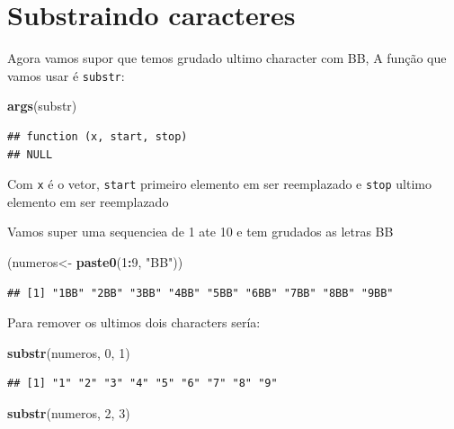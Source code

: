 \documentclass[]{book}
\newenvironment{Shaded}{\begin{snugshade}}{\end{snugshade}}
\newcommand{\KeywordTok}[1]{\textcolor[rgb]{0.13,0.29,0.53}{\textbf{#1}}}
\newcommand{\DecValTok}[1]{\textcolor[rgb]{0.00,0.00,0.81}{#1}}
\newcommand{\StringTok}[1]{\textcolor[rgb]{0.31,0.60,0.02}{#1}}
\newcommand{\OperatorTok}[1]{\textcolor[rgb]{0.81,0.36,0.00}{\textbf{#1}}}
\newcommand{\NormalTok}[1]{#1}
\theoremstyle{definition}
\theoremstyle{definition}
\theoremstyle{definition}
\theoremstyle{remark}
\begin{document}
\section{Substraindo caracteres}\label{substraindo-caracteres}

Agora vamos supor que temos grudado ultimo character com BB, A função
que vamos usar é \texttt{substr}:

\begin{Shaded}
\begin{Highlighting}[]
\KeywordTok{args}\NormalTok{(substr)}
\end{Highlighting}
\end{Shaded}

\begin{verbatim}
## function (x, start, stop) 
## NULL
\end{verbatim}

Com \texttt{x} é o vetor, \texttt{start} primeiro elemento em ser
reemplazado e \texttt{stop} ultimo elemento em ser reemplazado

Vamos super uma sequenciea de 1 ate 10 e tem grudados as letras BB

\begin{Shaded}
\begin{Highlighting}[]
\NormalTok{(numeros<-}\StringTok{ }\KeywordTok{paste0}\NormalTok{(}\DecValTok{1}\OperatorTok{:}\DecValTok{9}\NormalTok{, }\StringTok{"BB"}\NormalTok{))}
\end{Highlighting}
\end{Shaded}

\begin{verbatim}
## [1] "1BB" "2BB" "3BB" "4BB" "5BB" "6BB" "7BB" "8BB" "9BB"
\end{verbatim}

Para remover os ultimos dois characters sería:

\begin{Shaded}
\begin{Highlighting}[]
\KeywordTok{substr}\NormalTok{(numeros, }\DecValTok{0}\NormalTok{, }\DecValTok{1}\NormalTok{)}
\end{Highlighting}
\end{Shaded}

\begin{verbatim}
## [1] "1" "2" "3" "4" "5" "6" "7" "8" "9"
\end{verbatim}

\begin{Shaded}
\begin{Highlighting}[]
\KeywordTok{substr}\NormalTok{(numeros, }\DecValTok{2}\NormalTok{, }\DecValTok{3}\NormalTok{)}
\end{Highlighting}
\end{Shaded}
\end{document}
